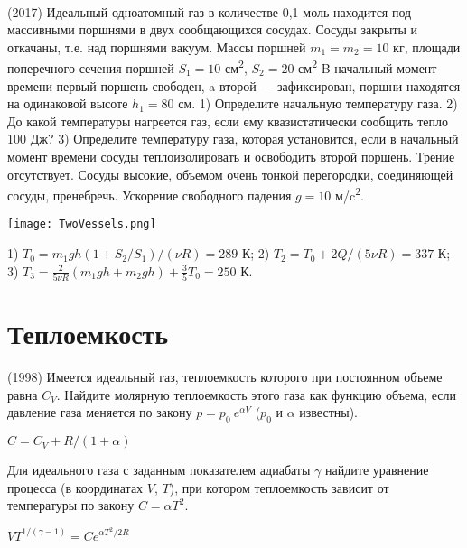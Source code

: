 \begin{ex}
\hspace{0pt} \\
\begin{minipage}{.65\textwidth}
(2017) Идеальный одноатомный газ в количестве 0,1 моль находится под массивными поршнями в двух сообщающихся сосудах. Сосуды закрыты и откачаны, т.е. над поршнями вакуум. Массы поршней $m_1 = m_2 = 10$ кг, площади поперечного сечения поршней $S_1 = 10$ см\textsuperscript{2}, $S_2 = 20$ см\textsuperscript{2} B начальный момент времени первый поршень свободен, a второй — зафиксирован, поршни находятся на одинаковой высоте $h_1 = 80$ см. 1) Определите начальную температуру газа. 2) До какой температуры нагреется газ, если ему квазистатически сообщить тепло 100 Дж? 3) Определите температуру газа, которая установится, если в начальный момент времени сосуды теплоизолировать и освободить второй поршень. Трение отсутствует. Сосуды высокие, объемом очень тонкой перегородки, соединяющей сосуды, пренебречь. Ускорение свободного падения $g = 10$ м/c\textsuperscript{2}.
\end{minipage}
\begin{minipage}{.35\textwidth}
\centering
\texttt{[image: TwoVessels.png]}
\end{minipage}
\begin{ans}
1) $T_0 = m_1gh(1+S_2/S_1)/(\nu R) = 289$ К;
2) $T_2 = T_0 + 2Q/(5\nu R) = 337$ К; 
3) $T_3 = \frac{2}{5\nu R}(m_1 gh + m_2 gh)+ \frac{3}{5}T_0 = 250$ К.
\end{ans}
\end{ex}

\section{Теплоемкость}

\begin{ex}
(1998) Имеется идеальный газ, теплоемкость которого при постоянном объеме равна $C_V$. 
Найдите молярную теплоемкость этого газа как функцию объема, если давление газа меняется по закону $p=p_0~e^{\alpha V}$ ($p_0$ и $\alpha$ известны).
\begin{ans}
$C = C_V + R/(1+\alpha)$
\end{ans}
\end{ex}

\begin{ex}
Для идеального газа с заданным показателем адиабаты $\gamma$ найдите уравнение процесса (в координатах $V$, $T$), при котором теплоемкость зависит от температуры по закону $C=\alpha T^2$.
\begin{ans}
$ V T^{1/(\gamma - 1)} = C e^{\alpha T^2 / 2R}$
\end{ans}
\end{ex}

